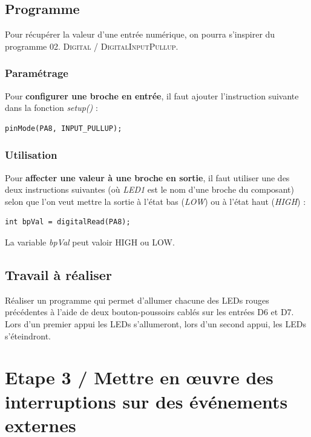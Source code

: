 \documentclass[a4paper,11pt,titlepage]{article} %
\begin{document}
\subsection{Programme}

Pour récupérer la valeur d'une entrée numérique, on pourra s'inspirer du programme \textsc{02. Digital / DigitalInputPullup}.

\subsubsection{Paramétrage}

Pour \textbf{configurer une broche en entrée}, il faut ajouter l'instruction suivante dans la fonction \textsl{setup()} :

\begin{lstlisting}
pinMode(PA8, INPUT_PULLUP);
\end{lstlisting}

\subsubsection{Utilisation}

Pour \textbf{affecter une valeur à une broche en sortie}, il faut utiliser une des deux instructions suivantes (où \textsl{LED1} est le nom d'une broche du composant) selon que l'on veut mettre la sortie à l'état bas (\textit{LOW}) ou à l'état haut (\textit{HIGH}) :

\begin{lstlisting}
int bpVal = digitalRead(PA8);
\end{lstlisting}

La variable \textsl{bpVal} peut valoir \textsc{HIGH} ou \textsc{LOW}.

\subsection{Travail à réaliser}

\Manip Réaliser un programme qui permet d'allumer chacune des LEDs rouges précédentes à l'aide de deux bouton-poussoirs cablés sur les entrées D6 et D7. Lors d'un premier appui les LEDs s'allumeront, lors d'un second appui, les LEDs s'éteindront.


\newpage
\section{Etape 3 / Mettre en \oe{}uvre des interruptions sur des événements externes}
\end{document}
